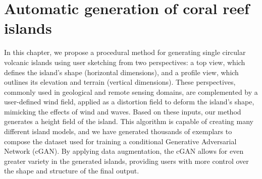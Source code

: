 
\graphicspath{ {./figures/cGAN_figures/} }

\chapter{Automatic generation of coral reef islands}
\label{chap:coral-island}

\abstract 
In this chapter, we propose a procedural method for generating single circular volcanic islands using user sketching from two perspectives: a top view, which defines the island's shape (horizontal dimensions), and a profile view, which outlines its elevation and terrain (vertical dimensions). These perspectives, commonly used in geological and remote sensing domains, are complemented by a user-defined wind field, applied as a distortion field to deform the island's shape, mimicking the effects of wind and waves. Based on these inputs, our method generates a height field of the island. This algorithm is capable of creating many different island models, and we have generated thousands of exemplars to compose the dataset used for training a conditional Generative Adversarial Network (cGAN). By applying data augmentation, the cGAN allows for even greater variety in the generated islands, providing users with more control over the shape and structure of the final output.
\pagebreak 

